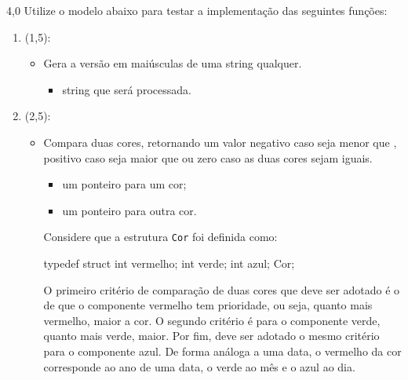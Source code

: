 \documentclass[
    12pt,     
    openright,
    twoside,  
    a4paper,  
    english,  
    brazil,   
]{memoir}
\begin{document}
\begin{questaoProgramacao}{4,0}{}{}
    Utilize o modelo abaixo para testar a implementação das seguintes funções:
    
    \begin{enumerate}
    
        \item {} (1,5):
        \begin{itemize}
            \item Gera a versão em maiúsculas de uma string qualquer.
            \begin{itemize}
                \item {} string que será processada.
            \end{itemize}
        \end{itemize}
        
        \item {} (2,5):
        \begin{itemize}
            \item Compara duas cores, retornando um valor negativo caso  seja menor que , positivo caso  seja maior que  ou zero caso as duas cores sejam iguais.
            \begin{itemize}
                \item {} um ponteiro para um cor;
                \item {} um ponteiro para outra cor.
            \end{itemize}
            Considere que a estrutura \texttt{Cor} foi definida como:
\begin{blocoC}
typedef struct {
    int vermelho;
    int verde;
    int azul;
} Cor;
\end{blocoC}
            O primeiro critério de comparação de duas cores que deve ser adotado é o de que o componente vermelho tem prioridade, ou seja, quanto mais vermelho, maior a cor. O segundo critério é para o componente verde, quanto mais verde, maior. Por fim, deve ser adotado o mesmo critério para o componente azul. De forma análoga a uma data, o vermelho da cor corresponde ao ano de uma data, o verde ao mês e o azul ao dia.
                \end{itemize}
    
    \end{enumerate}


\end{questaoProgramacao}
\end{document}
